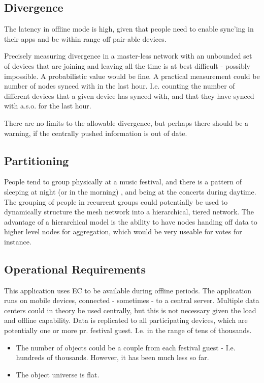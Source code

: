 \documentclass[11pt,a4paper]{report}
\begin{document}
\subsection{Divergence}
The latency in offline mode is high, given that people need to enable sync'ing in their apps and be within range off pair-able devices.

Precisely measuring divergence in a master-less network with an unbounded set of devices that are joining and leaving all the time is at best difficult - possibly impossible. A probabilistic value would be fine.
A practical measurement could be number of nodes synced with in the last hour. I.e. counting the number of different devices that a given device has synced with, and that they have synced with a.s.o. for the last hour.

There are no limits to the allowable divergence, but perhaps there should be a warning, if the centrally pushed information is out of date.

\subsection{Partitioning}
People tend to group physically at a music festival, and there is a pattern of sleeping at night (or in the morning) , and being at the concerts during daytime.
The grouping of people in recurrent groups could potentially be used to dynamically structure the mesh network into a hierarchical, tiered network.
The advantage of a hierarchical model is the ability to have nodes handing off data to higher level nodes for aggregation, which would be very useable for votes for instance.
\subsection{Operational Requirements}
This application uses EC to be available during offline periods.
The application runs on mobile devices, connected - sometimes - to a central server.
Multiple data centers could in theory be used centrally, but this is not necessary given the load and offline capability.
Data is replicated to all participating devices, which are potentially one or more pr. festival guest. I.e. in the range of tens of thousands.
\begin{itemize}
\item The number of objects could be a couple from each festival guest - I.e. hundreds of thousands. However, it has been much less so far.
\item The object universe is flat.
\end{itemize}
\end{document}
